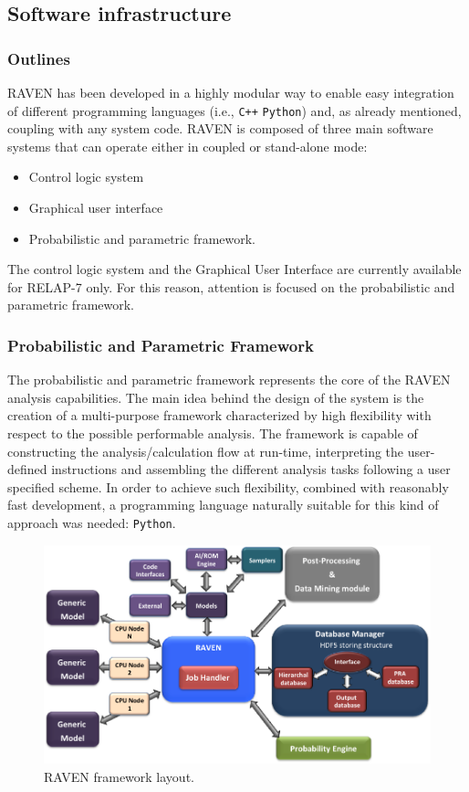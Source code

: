 \subsection{Software infrastructure}
\subsubsection{Outlines}
RAVEN has been developed in a highly modular way to enable easy integration of different programming languages (i.e., \texttt{C++} \texttt{Python}) and, as already mentioned, coupling with any system code.  
RAVEN is composed of three main software systems that can operate either in coupled or stand-alone mode:
\begin{itemize}
  \item Control logic system
  \item Graphical user interface
  \item Probabilistic and parametric framework.
\end{itemize}
The control logic system and the Graphical User Interface are currently available for RELAP-7 only. For this reason, attention is focused on the probabilistic and parametric framework.

\subsubsection{Probabilistic and Parametric Framework}
The probabilistic and parametric framework represents the core of the RAVEN analysis capabilities. The main idea behind the design of the system is the creation of a multi-purpose framework characterized by high flexibility with respect to the possible performable analysis. The framework is capable of constructing the analysis/calculation flow at run-time, interpreting the user-defined instructions and assembling the different analysis tasks following a user specified scheme. 
In order to achieve such flexibility, combined with reasonably fast development, a programming language naturally suitable for this kind of approach was needed: \texttt{Python}.  

\begin{figure}[ht]
  \centering
  \includegraphics[width=1.0\textwidth]  {pics/RavenFramework.png}
  \caption{RAVEN framework layout.}
  \label{fig:RAVENframeworkLayout}
\end{figure}

